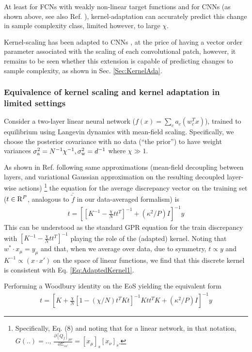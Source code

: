 At least for FCNs with weakly non-linear target functions and for CNNs (as shown above, see also Ref. \cite{naveh2021self}), kernel-adaptation can accurately predict this change in sample complexity class, limited however, to large $\chi$. 

Kernel-scaling has been adapted to CNNs \citep{RotondoCNN1,bassetti2024featurelearningfinitewidthbayesian}, at the price of having a vector order parameter associated with the scaling of each convolutional patch, however, it remains to be seen whether this extension is capable of predicting changes to sample complexity, as shown in Sec. \ref{Sec:KernelAda}. 



\subsubsection{Equivalence of kernel scaling and kernel adaptation in limited settings}
Consider a two-layer linear neural network ($f(x) = \sum_c a_c (w^T_c x)$), trained to equilibrium using Langevin dynamics with mean-field scaling. Specifically, we choose the posterior covariance with no data (``the prior'') to have weight variances $\sigma_{\rm a}^2=N^{-1} \chi^{-1},\sigma_{\rm w}^2=d^{-1}$ where $\chi \gg 1$. 

As shown in Ref. \cite{seroussi2023separation} following same approximations (mean-field decoupling between layers, and variational Gaussian approximation on the resulting decoupled layer-wise actions) \footnote{Specifically, Eq. (8) and noting that for a linear network, in that notation, $G(..)=..$, $\frac{\partial [Q_f]_{\mu \nu}}{\partial \Sigma_{ss'}}=[x_{\mu}]_s [x_{\nu}]_{s'}$} the equation for the average discrepancy vector on the training set ($t \in {\rm R}^P$, analogous to $\bar{\tilde{f}}$ in our data-averaged formalism)  is 
\begin{align}
t = \left[[K^{-1} - \frac{\chi}{N} t t^T]^{-1}+(\kappa^2/P) I\right]^{-1} y
\end{align}
This can be understood as the standard GPR equation for the train discrepancy with $[K^{-1} - \frac{\chi}{N} t t^T]^{-1}$ playing the role of the (adapted) kernel. Noting that $w^{*} \cdot x_{\mu}=y_{\mu}$ and that, when we average over data, due to symmetry, $ t \propto y$ and $K^{-1} \propto (x \cdot x')$ on the space of linear functions, we find that this discrete kernel is consistent with Eq. \ref{Eq:AdaptedKernel1}.

Performing a Woodbury identity on the EoS yielding the equivalent form 
\begin{align}
\label{Eq:EoS}
t = \left[K+\frac{\chi}{N}[1-(\chi/N)t^T K t]^{-1} Ktt^TK +(\kappa^2/P) I\right]^{-1} y
\end{align}

